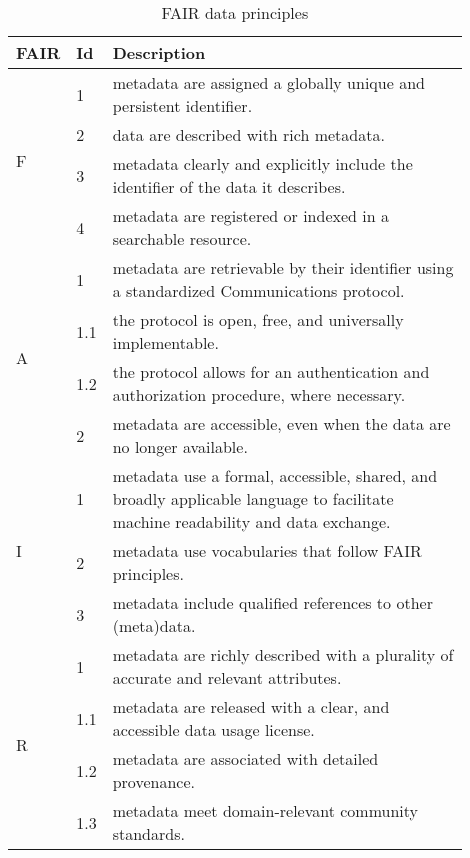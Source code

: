 \documentclass[preprint,12pt]{elsarticle}
\begin{document}
\begin{table*}[!htb]
\scriptsize
\caption{FAIR data principles\label{tab:FAIR for data}}
\renewcommand{\arraystretch}{1.1}

\centering
\begin{tabular}{|p{0.05\linewidth}|p{0.05\linewidth}|p{0.8\linewidth}|}
\hline
FAIR & Id & Description \\
\hline

\multirow{4}{*}{F} & {1} & metadata are assigned a globally unique and persistent identifier. \\
\cline{2-3}
 & {2} & data are described with rich metadata. \\
\cline{2-3}
 & {3} & metadata clearly and explicitly include the identifier of the data it describes. \\
\cline{2-3}
  & {4} & metadata are registered or indexed in a searchable resource.\\
\hline

\multirow{4}{*}{A} & {1} & metadata are retrievable by their identifier using a standardized Communications protocol.    \\
\cline{2-3}
 & {1.1} & the protocol is open, free, and universally implementable.\\
\cline{2-3}
 & {1.2} & the protocol allows for an authentication and authorization procedure, where necessary.\\
\cline{2-3}
 & {2} & metadata are accessible, even when the data are no longer available.   \\
\hline


\multirow{3}{*}{I} & {1} & metadata use a formal, accessible, shared, and broadly applicable language to facilitate machine readability and data exchange.  \\
\cline{2-3}
 & {2} & metadata use vocabularies that follow FAIR principles.  \\
\cline{2-3}
 & {3} & metadata include qualified references to other (meta)data.  \\
\hline

\multirow{4}{*}{R} & {1} & metadata are richly described with a plurality of accurate and relevant attributes. \\
\cline{2-3}
 & {1.1} & metadata are released with a clear, and accessible data usage license.\\
\cline{2-3}
 & {1.2} & metadata are associated with detailed provenance. \\
\cline{2-3}
 & {1.3} & metadata meet domain-relevant community standards. \\
\hline

\end{tabular}
\end{table*}
\end{document}
